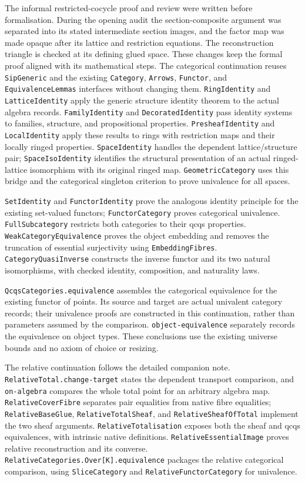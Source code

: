 \documentclass[11pt]{amsart}
\theoremstyle{definition}\newtheorem{definition}[theorem]{Definition}
\theoremstyle{remark}\newtheorem{remark}[theorem]{Remark}
\begin{document}
The informal restricted-cocycle proof and review were written before
formalisation. During the opening audit the section-composite argument
was separated into its stated intermediate section images, and the
factor map was made opaque after its lattice and restriction equations.
The reconstruction triangle is checked at its defining glued space.
These changes keep the formal proof aligned with its mathematical steps.
The categorical continuation reuses \texttt{SipGeneric} and the existing
\texttt{Category}, \texttt{Arrows}, \texttt{Functor}, and
\texttt{EquivalenceLemmas} interfaces without changing them.
\texttt{RingIdentity} and \texttt{LatticeIdentity} apply the generic
structure identity theorem to the actual algebra records.
\texttt{FamilyIdentity} and \texttt{DecoratedIdentity} pass identity
systems to families, structure, and propositional properties.
\texttt{PresheafIdentity} and \texttt{LocalIdentity} apply these results
to rings with restriction maps and their locally ringed properties.
\texttt{SpaceIdentity} handles the dependent lattice/structure pair;
\texttt{SpaceIsoIdentity} identifies the structural presentation of
an actual ringed-lattice isomorphism with its original ringed map.
\texttt{GeometricCategory} uses this bridge and the categorical
singleton criterion to prove univalence for all spaces.

\texttt{SetIdentity} and \texttt{FunctorIdentity} prove the analogous
identity principle for the existing set-valued functors;
\texttt{FunctorCategory} proves categorical univalence.
\texttt{FullSubcategory} restricts both categories to their qcqs
properties. \texttt{WeakCategoryEquivalence} proves the object
embedding and removes the truncation of essential surjectivity using
\texttt{EmbeddingFibres}. \texttt{CategoryQuasiInverse} constructs the
inverse functor and its two natural isomorphisms, with checked identity,
composition, and naturality laws.

\texttt{QcqsCategories.equivalence} assembles the categorical equivalence
for the existing functor of points. Its source and target are actual
univalent category records; their univalence proofs are constructed in
this continuation, rather than parameters assumed by the comparison.
\texttt{object-equivalence} separately records the equivalence on object
types. These conclusions use the existing universe bounds and no axiom
of choice or resizing.

The relative continuation follows the detailed companion note.
\texttt{RelativeTotal.change-target} states the dependent transport
comparison, and \texttt{on-algebra} compares the whole total point for
an arbitrary algebra map. \texttt{RelativeCoverFibre} separates pair
equalities from native fibre equalities; \texttt{RelativeBaseGlue},
\texttt{RelativeTotalSheaf}, and \texttt{RelativeSheafOfTotal} implement
the two sheaf arguments. \texttt{RelativeTotalisation} exposes both the
sheaf and qcqs equivalences, with intrinsic native definitions.
\texttt{RelativeEssentialImage} proves relative reconstruction and its
converse. \texttt{RelativeCategories.Over[K].equivalence} packages the
relative categorical comparison, using \texttt{SliceCategory} and
\texttt{RelativeFunctorCategory} for univalence.
\end{document}

